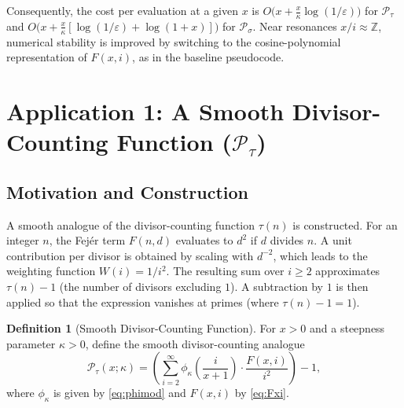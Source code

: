 \documentclass[11pt,a4paper]{amsart}
\theoremstyle{plain}
\theoremstyle{definition}
\newtheorem{definition}[theorem]{Definition}
\theoremstyle{remark}
\begin{document}
Consequently, the cost per evaluation at a given $x$ is $O\!\bigl(x+\tfrac{x}{\kappa}\log(1/\varepsilon)\bigr)$ for $\mathcal P_\tau$ and $O\!\bigl(x+\tfrac{x}{\kappa}[\log(1/\varepsilon)+\log(1+x)]\bigr)$ for $\mathcal P_\sigma$. Near resonances $x/i\approx\mathbb{Z}$, numerical stability is improved by switching to the cosine-polynomial representation of $F(x,i)$, as in the baseline pseudocode.

\section{Application 1: A Smooth Divisor-Counting Function (\texorpdfstring{$\mathcal{P}_{\tau}$}{P_tau})}

\subsection{Motivation and Construction}
A smooth analogue of the divisor-counting function $\tau(n)$ is constructed. For an integer $n$, the Fejér term $F(n,d)$ evaluates to $d^2$ if $d$ divides $n$. A unit contribution per divisor is obtained by scaling with $d^{-2}$, which leads to the weighting function $W(i)=1/i^2$. The resulting sum over $i \ge 2$ approximates $\tau(n)-1$ (the number of divisors excluding $1$). A subtraction by $1$ is then applied so that the expression vanishes at primes (where $\tau(n)-1=1$).

\begin{definition}[Smooth Divisor-Counting Function]
For $x>0$ and a steepness parameter $\kappa>0$, define the smooth divisor-counting analogue
\begin{equation}\label{eq:Ptau}
\mathcal{P}_{\tau}(x; \kappa) = \left( \sum_{i=2}^{\infty} \phi_{\kappa}\!\left(\frac{i}{x+1}\right) \cdot \frac{F(x,i)}{i^2} \right) - 1,
\end{equation}
where $\phi_{\kappa}$ is given by \eqref{eq:phimod} and $F(x,i)$ by \eqref{eq:Fxi}.
\end{definition}
\end{document}

